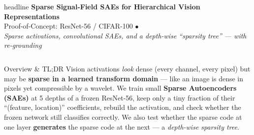 \documentclass[final]{beamer}
\newlength{\colwidth}
\begin{document}
\begin{frame}[t]

\begin{beamercolorbox}[wd=\paperwidth, ht=9cm, center, sep=1cm]{headline}
  {\Huge\bfseries Sparse Signal-Field SAEs for Hierarchical Vision Representations}\\[0.6em]
  {\Large Proof-of-Concept: ResNet-56 / CIFAR-100 \quad $\bullet$ }\\[0.6em]
  {\large \textit{Sparse activations, convolutional SAEs, and a depth-wise ``sparsity tree'' --- with re-grounding}}
\end{beamercolorbox}

\vspace{0.5cm}

\begin{columns}[t]

\begin{column}{\colwidth}

\begin{block}{Overview \& TL;DR}
\small
Vision activations \textit{look} dense (every channel, every pixel) but may be
\textbf{sparse in a learned transform domain} --- like an image is dense in pixels
yet compressible by a wavelet.  We train small \textbf{Sparse Autoencoders (SAEs)}
at 5 depths of a frozen ResNet-56, keep only a tiny fraction of their
``(feature, location)'' coefficients, rebuild the activation, and check whether
the frozen network still classifies correctly.  We also test whether the sparse
code at one layer \textbf{generates} the sparse code at the next --- a
\emph{depth-wise sparsity tree}.


\end{block}
\end{column}
\end{columns}
\end{frame}
\end{document}

